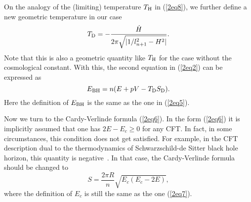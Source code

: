 \documentclass[a4paper,12pt]{article}
\begin{document}
   

On the analogy of the (limiting) temperature $T_{\rm H}$ in (\ref{2eq8}),
we  further  define a new geometric temperature in  our case
\begin{equation}
\label{2eq14}
 T_{\rm D}= -\frac{\dot H}{2\pi
  \sqrt{|1/l_{n+1}^2-H^2|}}.
\end{equation}
Note that this is also a geometric quantity like $T_{\rm H}$ for the case without 
the cosmological constant.  With this,  the second equation 
in (\ref{2eq2}) can be expressed as
\begin{equation}
\label{2eq15}
 E_{\rm BH}=n(E +pV -T_{\rm D}S_{\rm D}).
\end{equation}
Here the definition of $E_{\rm BH}$ is the same as the one in
(\ref{2eq5}).

Now we turn to the Cardy-Verlinde formula (\ref{2eq6}). In the
form (\ref{2eq6}) it is implicitly assumed that one has $2E-E_c \ge
0$ for any CFT. In fact, in some circumstances, this condition
does not get satisfied. For example, in the CFT description dual
to the thermodynamics of Schwarzschild-de Sitter black hole
horizon, this quantity is negative~\cite{Cai2}. In that case,
the Cardy-Verlinde formula should be changed to
\begin{equation}
\label{2eq16} S=\frac{2\pi R}{n}\sqrt{E_c(E_c-2E)},
\end{equation}
where the definition of $E_c$ is still the same as the one
(\ref{2eq7}).
\end{document}
